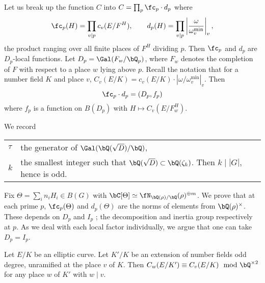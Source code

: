 Let us break up the function $C$ into $C = \prod_p  \fc_p \cdot d_p$ where
\begin{equation}\label{c-and-d}
         \fc_p(H) = \prod_{v | p}  c_v(E / F^H) , \qquad d_p(H) = \prod_{v | p} \left|\frac{\omega}{\omega_{v}^{\min}}\right|_v, 
\end{equation}
the product ranging over all finite places of $F^H$ dividing $p$.
Then $\fc_p$ and $d_p$ are $D_p$-local functions. Let $D_p = \Gal(F_w / \bQ_p)$, where $F_w$ denotes the completion of $F$ with respect to a place $w$ lying above $p$. Recall the notation that for a number field $K$ and place $v$, $C_v(E / K) = c_v(E / K) \cdot \left| \omega / \omega_v^{\min} \right|_v.$ 
Then
\begin{equation}\label{Dp-loc}
\fc_p \cdot d_p = (D_p, f_p)
\end{equation}
where $f_p$ is a function on $B(D_p)$ with $H \mapsto C_v(E / F_w^H)$.

We record
\begin{table}[H]
         \vspace{-1em}
         \setlength\itemsep{0em}
        \centering
\begin{tabular}{l l}
    $\tau$ & the generator of $\Gal(\bQ(\sqrt{D}) / \bQ)$, \\
    $k$ & the smallest integer such that $\bQ(\sqrt{D}) \subset \bQ(\zeta_k)$. Then $k \mid |G|$, hence is odd.
\end{tabular}
\vspace{-1em}
\end{table}
Fix $\Theta = \sum_i n_i H_i \in B(G)$ with $\bC[\Theta] \simeq \repnorm{\rho}^{\oplus m}$. We prove that at each prime $p$, $\fc_p(\Theta)$ and $d_p(\Theta)$ are the norms of elements from $\bQ(\rho)^{\times}$.  These depends on $D_p$ and $I_p$ ; the decomposition and inertia group respectively at $p$. As we deal with each local factor individually, we argue that one can take $D_p = I_p$.

\begin{lemma}\label{tam-up-to-square}
    Let $E / K$ be an elliptic curve. Let $K' / K$ be an extension of number fields odd degree, unramified at the place $v$ of $K$. Then $C_w(E / K') \equiv C_v(E / K) \mod \bQ^{\times 2}$ for any place $w$ of $K'$ with $ w \mid v$. 
\end{lemma}

